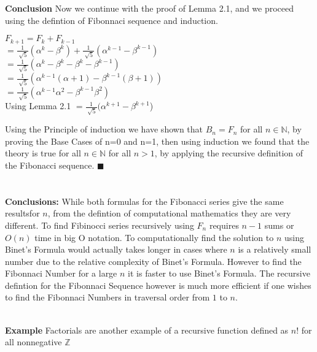 \documentclass{article}
\begin{document}
{\bf Conclusion} Now we continue with the proof of Lemma 2.1, and we proceed using the defintion of Fibonnaci sequence and induction.
\begin{center}
	$F_{k+1}=F_{k}+F_{k-1}$
	\\
	$
	=\frac{1}{\sqrt[]{5}}(\alpha^k-\beta^k)+\frac{1}{\sqrt[]{5}}(\alpha^{k-1}-\beta^{k-1})
$
\\
$
=
\frac{1}{\sqrt[]{5}}(\alpha^k-\beta^k-\beta^k-\beta^{k-1})
$
\\
$=\frac{1}{\sqrt[]{5}}(\alpha^{k-1}(\alpha+1)-\beta^{k-1}(\beta+1))$
\\
$=\frac{1}{\sqrt[]{5}}(\alpha^{k-1}\alpha^{2}-\beta^{k-1}\beta^2)$
\\
Using Lemma 2.1
$=\frac{1}{\sqrt[]{5}}(\alpha^{k+1}-\beta^{k+1}$)
\\
\end{center}
Using the Principle of induction we have shown that $B_n=F_n$ for all $n \in {\mathbb N}$, by proving the Base Cases of n=0 and n=1, then using induction we found that the theory is true for all $n \in {\mathbb N}$ for all $n>1$, by applying the recursive definition of the Fibonacci sequence.   
$\blacksquare$
\\
~\\
~\\
{\bf Conclusions:} While both formulas for the Fibonacci series give the same resultsfor $n$, from the defintion of computational mathematics they are very different. To find Fibinocci series recursively using $F_n$ requires $n-1$ sums or $O(n)$ time in big O notation. To computationally find the solution to $n$ using Binet's Formula would actually takes longer in cases where $n$ is a relatively small number due to the relative complexity of Binet's Formula.  However to find the Fibonnaci Number for a large $n$ it is faster to use Binet's Formula. The recursive defintion for the Fibonnaci Sequence however is much more efficient if one wishes to find the Fibonnaci Numbers in traversal order from $1$ to $n$.      
\\
\begin{comment}
	ToDo: Factorials, Other math stuff (like Catlan numbers) glanced over, Finally Computer Science implementation,Other applications: in nature Fractals
	also: recursive humor, recursive acronym: discuss recursion in languages?
\end{comment}
\\
{\bf Example} Factorials are another example of a recursive function defined as $n!$ for all nonnegative $\mathbb{Z}$
\\
\end{document}
